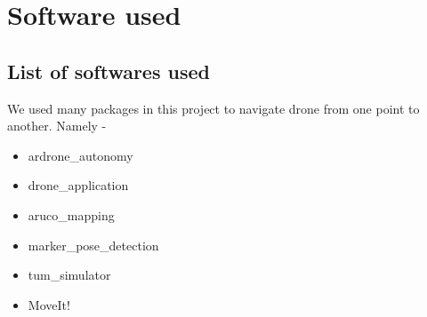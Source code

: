 \documentclass[a4paper,12pt,oneside]{book}
\begin{document}
\pagebreak
\chapter[Software used]{Software used}

  \section{List of softwares used}  
  We used many packages in this project to navigate drone from one point to another. Namely -
\begin{itemize}
\item ardrone\_autonomy
\item drone\_application
\item aruco\_mapping
\item marker\_pose\_detection
\item tum\_simulator
\item MoveIt!
\end{itemize}
\end{document}
